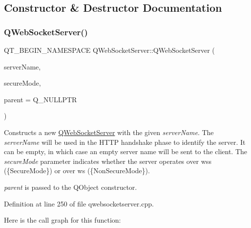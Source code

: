 \subsection{Constructor \& Destructor Documentation}
\mbox{\label{class_q_web_socket_server_a37bfbbb8ec6c171fd2b6b04b556dfc6d}} 
\subsubsection{\texorpdfstring{Q\+Web\+Socket\+Server()}{QWebSocketServer()}}
{\footnotesize\ttfamily Q\+T\+\_\+\+B\+E\+G\+I\+N\+\_\+\+N\+A\+M\+E\+S\+P\+A\+CE Q\+Web\+Socket\+Server\+::\+Q\+Web\+Socket\+Server (\begin{DoxyParamCaption}\item[{const Q\+String \&}]{server\+Name,  }\item[{\mbox{\hyperlink{class_q_web_socket_server_a07ce392fd4fa351746e48b00428366b8}{Ssl\+Mode}}}]{secure\+Mode,  }\item[{Q\+Object $\ast$}]{parent = {\ttfamily Q\+\_\+NULLPTR} }\end{DoxyParamCaption})\hspace{0.3cm}{\ttfamily [explicit]}}

Constructs a new \mbox{\hyperlink{class_q_web_socket_server}{Q\+Web\+Socket\+Server}} with the given {\itshape server\+Name}. The {\itshape server\+Name} will be used in the H\+T\+TP handshake phase to identify the server. It can be empty, in which case an empty server name will be sent to the client. The {\itshape secure\+Mode} parameter indicates whether the server operates over wss (\{Secure\+Mode\}) or over ws (\{Non\+Secure\+Mode\}).

{\itshape parent} is passed to the Q\+Object constructor. 

Definition at line 250 of file qwebsocketserver.\+cpp.

Here is the call graph for this function\+:
\mbox{\label{class_q_web_socket_server_aeb28af09252bac11fb1faf6b7fdee272}} 
